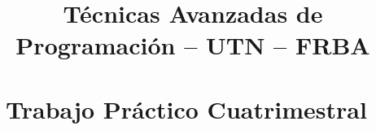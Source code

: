 \newcommand{\formalidadesTercerEnunciado}{
 \section{Objetivos y forma de entrega}
 
  El objetivo de esta entrega es construir un DSL utilizando el lenguaje Groovy para permitir la creación de reuniones según lo
  especificado en la siguiente sección. Es un requerimiento básico que el DSL generado interactúe con la solución desarrollada en Java
  en las entregas anteriores.
  Es importante también tratar de lograr que el DSL creado sea lo más expresivo posible considerando al menos los elementos del
  lenguaje vistos en clase.
  \smallskip
  
  Nos planteamos como objetivo resolver las correcciones del TP en el día para ello deberán coordinar con el tutor algún mecanismo
  para tener a mano el código y poder verlo en conjunto.


  \section{Nuevos requerimientos}
 
}

\title{Técnicas Avanzadas de Programación -- UTN -- FRBA\vspace{.2\baselineskip}
       \\ \cuatrimestre\
       \\ Trabajo Práctico Cuatrimestral\
       \\ \textbf{\textsc{\nombreTP}}\
       \\ 
       {\small {\urlReferencia}}
       \bigskip
      }
\date{}
\newcommand{\newest}[1]{#1} %
\newcommand{\oldest}[1]{}%

\newcommand{\flecha}{->}
\newcommand{\newconcept}[1]{\emph{#1}}

\DefineShortVerb{\|}

\author{}
	
